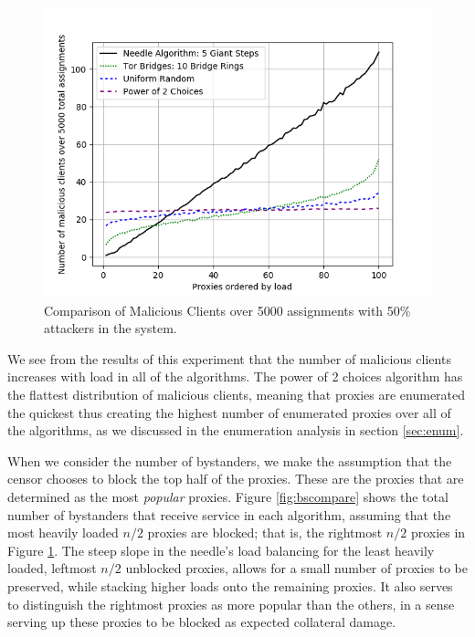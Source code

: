 \begin{figure}[h!]
\centering
     \includegraphics[width=1.0\textwidth]{fig/malicious_comparison_p_50_to_n_100_5000.png}
    \caption{Comparison of Malicious Clients over 5000 assignments with 50\% attackers in the system.}

    \label{fig:malcompare}
\end{figure}

We see from the results of this experiment that the number of malicious clients increases with load in all of the algorithms. The power of 2 choices algorithm has the flattest distribution of malicious clients, meaning that proxies are enumerated the quickest thus creating the highest number of enumerated proxies over all of the algorithms, as we discussed in the enumeration analysis in section \ref{sec:enum}.

When we consider the number of bystanders, we make the assumption that the censor chooses to block the top half of the proxies. These are the proxies that are determined as the most \textit{popular} proxies. Figure \ref{fig:bscompare} shows the total number of bystanders that receive service in each algorithm, assuming that the most heavily loaded $n/2$ proxies are blocked; that is, the rightmost $n/2$ proxies in Figure \ref{fig:malcompare}. The steep slope in the needle's load balancing for the least heavily loaded, leftmost $n/2$ unblocked proxies, allows for a small number of proxies to be preserved, while stacking higher loads onto the remaining proxies. It also serves to distinguish the rightmost proxies as more popular than the others, in a sense serving up these proxies to be blocked as expected collateral damage.

